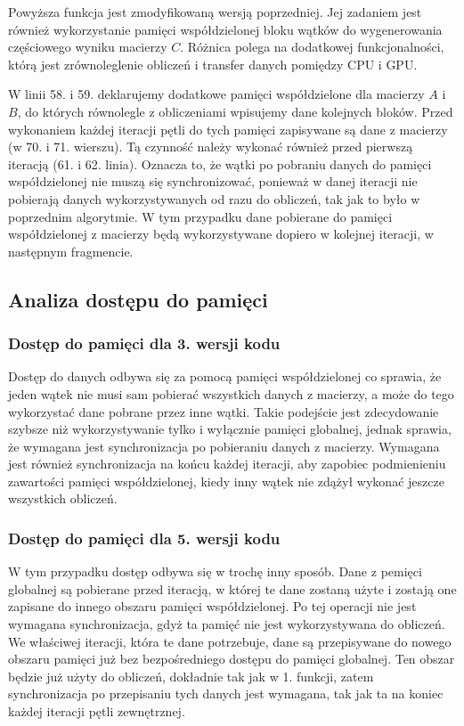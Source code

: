 \documentclass{article}
\begin{document}
Powyższa funkcja jest zmodyfikowaną wersją poprzedniej. Jej zadaniem jest również wykorzystanie pamięci współdzielonej bloku wątków do wygenerowania częściowego wyniku macierzy $C$. Różnica polega na dodatkowej funkcjonalności, którą jest zrównoleglenie obliczeń i transfer danych pomiędzy CPU i GPU.

W linii 58. i 59. deklarujemy dodatkowe pamięci współdzielone dla macierzy $A$ i $B$, do których równolegle z obliczeniami wpisujemy dane kolejnych bloków. Przed wykonaniem każdej iteracji pętli do tych pamięci zapisywane są dane z macierzy (w 70. i 71. wierszu). Tą czynność należy wykonać również przed pierwszą iteracją (61. i 62. linia). Oznacza to, że wątki po pobraniu danych do pamięci współdzielonej nie muszą się synchronizować, ponieważ w danej iteracji nie pobierają danych wykorzystywanych od razu do obliczeń, tak jak to było w poprzednim algorytmie. W tym przypadku dane pobierane do pamięci współdzielonej z macierzy będą wykorzystywane dopiero w kolejnej iteracji, w następnym fragmencie.

\subsection{Analiza dostępu do pamięci}

\subsubsection{Dostęp do pamięci dla 3. wersji kodu}

Dostęp do danych odbywa się za pomocą pamięci współdzielonej co sprawia, że jeden wątek nie musi sam pobierać wszystkich danych z macierzy, a może do tego wykorzystać dane pobrane przez inne wątki. Takie podejście jest zdecydowanie szybsze niż wykorzystywanie tylko i wyłącznie pamięci globalnej, jednak sprawia, że wymagana jest synchronizacja po pobieraniu danych z macierzy. Wymagana jest również synchronizacja na końcu każdej iteracji, aby zapobiec podmienieniu zawartości pamięci współdzielonej, kiedy inny wątek nie zdążył wykonać jeszcze wszystkich obliczeń.

\subsubsection{Dostęp do pamięci dla 5. wersji kodu}

W tym przypadku dostęp odbywa się w trochę inny sposób. Dane z pemięci globalnej są pobierane przed iteracją, w której te dane zostaną użyte i zostają one zapisane do innego obszaru pamięci współdzielonej. Po tej operacji nie jest wymagana synchronizacja, gdyż ta pamięć nie jest wykorzystywana do obliczeń. We właściwej iteracji, która te dane potrzebuje, dane są przepisywane do nowego obszaru pamięci już bez bezpośredniego dostępu do pamięci globalnej. Ten obszar będzie już użyty do obliczeń, dokładnie tak jak w 1. funkcji, zatem synchronizacja po przepisaniu tych danych jest wymagana, tak jak ta na koniec każdej iteracji pętli zewnętrznej.
\end{document}
